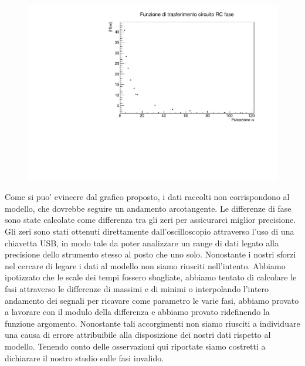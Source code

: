 \begin{figure}[H]
    \centering
    \includegraphics[scale=.4]{Immagini/fase RC.pdf}
    \caption{}
\end{figure}

Come si puo’ evincere dal grafico proposto, i dati raccolti non corrispondono al modello, che dovrebbe seguire un andamento arcotangente.
Le differenze di fase sono state calcolate come differenza 
tra gli zeri per assicurarci miglior precisione. Gli zeri sono stati ottenuti direttamente dall’oscilloscopio attraverso l'uso di una chiavetta USB, in modo tale da poter analizzare un range di 
dati legato alla precisione dello strumento stesso al posto che uno solo. Nonostante i nostri sforzi nel cercare di legare i dati al modello non siamo riusciti nell'intento. Abbiamo ipotizzato che le scale dei tempi fossero sbagliate, abbiamo tentato di calcolare le fasi attraverso le differenze di massimi e di minimi o interpolando l'intero andamento dei segnali per ricavare come parametro le varie fasi, abbiamo provato a lavorare con il modulo della differenza e abbiamo provato ridefinendo la funzione argomento. Nonostante tali accorgimenti non siamo riusciti a individuare una causa di errore attribuibile alla disposizione dei nostri dati rispetto al modello. Tenendo conto delle osservazioni qui riportate siamo costretti a dichiarare il nostro studio sulle fasi invalido.

